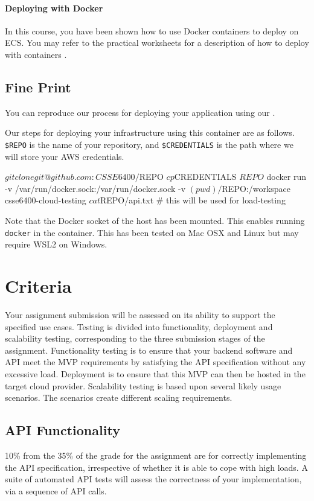 \documentclass{csse4400}
\begin{document}
\paragraph{Deploying with Docker}
In this course, you have been shown how to use Docker containers to deploy on ECS. You may refer to the practical worksheets for a description of how to deploy with containers \cite{prac-week5}.

\subsection{Fine Print}
You can reproduce our process for deploying your application using our
.

Our steps for deploying your infrastructure using this container are as follows.
\texttt{\$REPO} is the name of your repository, and
\texttt{\$CREDENTIALS} is the path where we will store your AWS credentials.
\begin{code}[language=shell]{}
$ git clone git@github.com:CSSE6400/$REPO
$ cp $CREDENTIALS $REPO
$ docker run -v /var/run/docker.sock:/var/run/docker.sock -v $(pwd)/$REPO:/workspace csse6400-cloud-testing
$ cat $REPO/api.txt # this will be used for load-testing
\end{code}

Note that the Docker socket of the host has been mounted. This enables running \texttt{docker} in the container. This has been tested on Mac OSX and Linux but may require WSL2 on Windows.


\section{Criteria}
Your assignment submission will be assessed on its ability to support the specified use cases.
Testing is divided into functionality, deployment and scalability testing,
corresponding to the three submission stages of the assignment.
Functionality testing is to ensure that your backend software and API
meet the MVP requirements by satisfying the API specification without any excessive load.
Deployment is to ensure that this MVP can then be hosted in the target cloud provider.
Scalability testing is based upon several likely usage scenarios.
The scenarios create different scaling requirements.

\subsection{API Functionality} %
10\% from the 35\% of the grade for the assignment are for correctly implementing the API specification,
irrespective of whether it is able to cope with high loads.
A suite of automated API tests will assess the correctness of your implementation, via a sequence of API calls.
\end{document}
